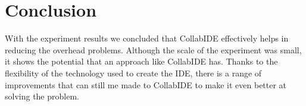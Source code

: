 
\section{Conclusion}
\label{sec:conclusion}


With the experiment results we concluded that CollabIDE effectively helps in reducing the overhead 
problems. Although the scale of the experiment was small, it shows the potential that an approach like 
CollabIDE has. Thanks to the flexibility of the technology used to create the IDE, there is a range of 
improvements that can still me made to CollabIDE to make it even better at solving the problem.  



\endinput